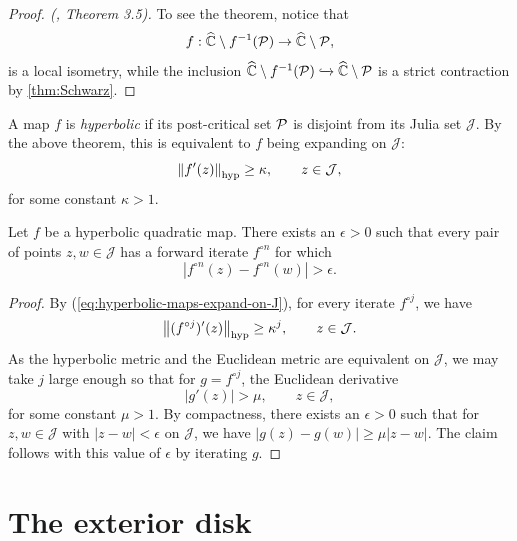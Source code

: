  \begin{proof}[Proof. (\cite{mcmullen_1994}, Theorem 3.5)]
	To see the theorem, notice that
	$$f: \widehat {\mathbb C} \setminus  f^{-1}(\operatorname{\mathcal P}) \to \widehat {\mathbb C} \setminus \operatorname{\mathcal P},
	$$
	is a local isometry, while the  inclusion 
	$\widehat {\mathbb C} \setminus f^{-1}(\operatorname{\mathcal P}) \xhookrightarrow{} 
	\widehat {\mathbb C} \setminus \operatorname{\mathcal P}$ is a strict contraction by  \cref{thm:Schwarz}.
 \end{proof}
	 
A map $f$ is \emph{hyperbolic} if
 its post-critical set $\operatorname{\mathcal P}$ is disjoint from its Julia set $\mathcal J$.
 By the above theorem, this is equivalent to $f$ being expanding on $\mathcal J$:
	\begin{equation}
	\label{eq:hyperbolic-maps-expand-on-J}
		\left\Vert f'(z)\right\Vert_{\operatorname{hyp}} \geq \kappa, \qquad z \in \mathcal J,
	\end{equation} 
 for some constant $\kappa >1$.
 
 \begin{corollary} \label{elevator for points on julia}
	Let $f$ be a hyperbolic quadratic map.
	There exists an $\epsilon > 0$ such that 
	every pair of points $z,w\in\mathcal{J}$
	 has a forward iterate $f^{\circ n}$ for which 
	 \begin{equation*}
		|f^{\circ n}(z)-f^{\circ n}(w)|>\epsilon.	
	 \end{equation*}
\end{corollary}

\begin{proof}	
	By (\ref{eq:hyperbolic-maps-expand-on-J}), for every iterate $f^{\circ j}$, we have
	\begin{equation}
		\left\Vert (f^{\circ j})'(z)\right\Vert_{\operatorname{hyp}} \geq \kappa^j, \qquad z \in \mathcal J.
	\end{equation} 
	As the hyperbolic metric and the Euclidean metric are equivalent on $\mathcal J$,
	we may take $j$ large enough so that for $g=f^{\circ j}$, the Euclidean derivative
	$$|g'(z)| > \mu, \qquad z \in \mathcal J,$$
	 for some constant $\mu  > 1$. 
	By compactness, there exists an $\epsilon>0$ such that for $z, w \in \mathcal J$ with $|z-w| < \epsilon$ on $\mathcal J$,
	we have $|g(z)-g(w)| \geq \mu |z-w|$. The claim follows with this value of $\epsilon$ by iterating $g$.
\end{proof}

\section{The exterior disk}

